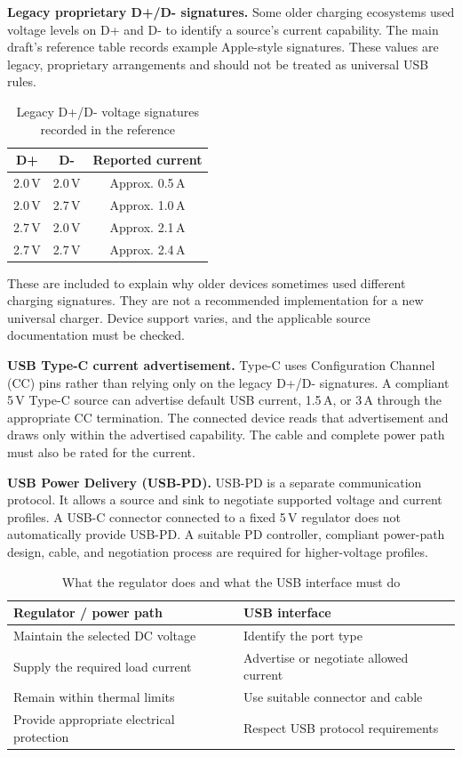 \documentclass[journal,12pt,twocolumn]{IEEEtran}
\begin{document}
\textbf{Legacy proprietary D+/D- signatures.}
Some older charging ecosystems used voltage levels on D+ and D-
to identify a source's current capability. The main draft's
reference table records example Apple-style signatures. These
values are legacy, proprietary arrangements and should not be
treated as universal USB rules.

\begin{table}[!t]
\centering
\caption{Legacy D+/D- voltage signatures recorded in the reference}
\label{tab:legacy-usb}
\small
\begin{tabular}{|c|c|c|}
\hline
\textbf{D+} & \textbf{D-} & \textbf{Reported current}\\ \hline
2.0\,V & 2.0\,V & Approx. 0.5\,A\\ \hline
2.0\,V & 2.7\,V & Approx. 1.0\,A\\ \hline
2.7\,V & 2.0\,V & Approx. 2.1\,A\\ \hline
2.7\,V & 2.7\,V & Approx. 2.4\,A\\ \hline
\end{tabular}
\end{table}
These are included to explain why older devices sometimes used
different charging signatures. They are not a recommended
implementation for a new universal charger. Device support varies,
and the applicable source documentation must be checked.

\textbf{USB Type-C current advertisement.}
Type-C uses Configuration Channel (CC) pins rather than relying
only on the legacy D+/D- signatures. A compliant 5\,V Type-C source
can advertise default USB current, 1.5\,A, or 3\,A through the
appropriate CC termination. The connected device reads that
advertisement and draws only within the advertised capability.
The cable and complete power path must also be rated for the
current.

\textbf{USB Power Delivery (USB-PD).}
USB-PD is a separate communication protocol. It allows a source
and sink to negotiate supported voltage and current profiles.
A USB-C connector connected to a fixed 5\,V regulator does not
automatically provide USB-PD. A suitable PD controller, compliant
power-path design, cable, and negotiation process are required
for higher-voltage profiles.

\begin{table}[!t]
\centering
\caption{What the regulator does and what the USB interface must do}
\label{tab:usb-responsibility}
\small
\begin{tabular}{|p{}|p{}|}
\hline
\textbf{Regulator / power path} & \textbf{USB interface}\\ \hline
Maintain the selected DC voltage & Identify the port type\\ \hline
Supply the required load current & Advertise or negotiate allowed current\\ \hline
Remain within thermal limits & Use suitable connector and cable\\ \hline
Provide appropriate electrical protection & Respect USB protocol requirements\\ \hline
\end{tabular}
\end{table}
\end{document}
